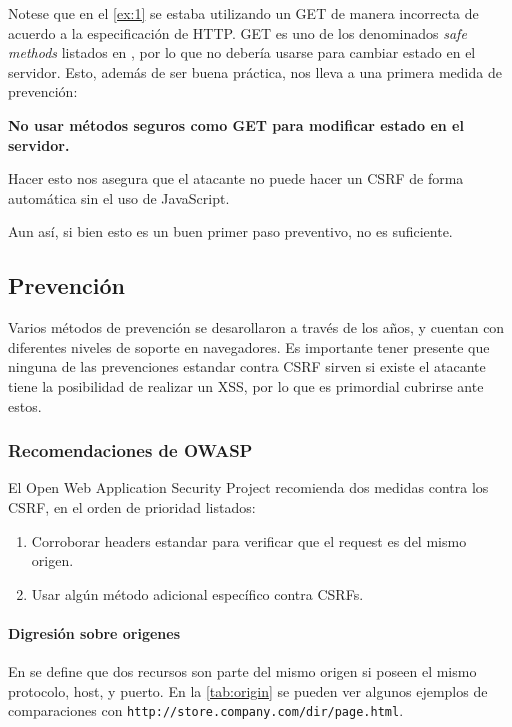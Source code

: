 \documentclass{article}
\theoremstyle{definition}
\begin{document}
Notese que en el \autoref{ex:1} se estaba utilizando un GET de manera
incorrecta de acuerdo a la especificación de HTTP. GET es uno de los
denominados \textit{safe methods} listados en \cite{rfc7231}, por lo que no
debería usarse para cambiar estado en el servidor. Esto, además de ser buena
práctica, nos lleva a una primera medida de prevención:

\begin{center}
\textbf{No usar métodos seguros como GET para modificar estado en el
servidor.}
\end{center}

Hacer esto nos asegura que el atacante no puede hacer un CSRF de forma
automática sin el uso de JavaScript.

Aun así, si bien esto es un buen primer paso preventivo, no es suficiente.

\subsection{Prevención}
Varios métodos de prevención se desarollaron a través de los años, y cuentan con
diferentes niveles de soporte en navegadores. Es importante tener presente que
ninguna de las prevenciones estandar contra CSRF sirven si existe el atacante tiene la
posibilidad de realizar un XSS, por lo que es primordial cubrirse ante estos.

\subsubsection{Recomendaciones de OWASP}
El Open Web Application Security Project \cite{owasp} recomienda dos medidas
contra los CSRF, en el orden de prioridad listados:

\begin{enumerate}
  \item Corroborar headers estandar para verificar que el request es del mismo origen.
  \item Usar algún método adicional específico contra CSRFs.
\end{enumerate}

\paragraph{Digresión sobre origenes} En \cite{rfc6454} se define que dos recursos son parte del mismo
origen si poseen el mismo protocolo, host, y puerto. En la \autoref{tab:origin} se pueden ver
algunos ejemplos de comparaciones con \texttt{http://store.company.com/dir/page.html}.
\end{document}
